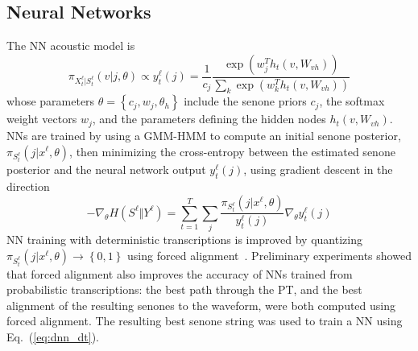 \subsection{Neural Networks}

The NN acoustic model is
\[
\pi_{X_t^{\ell}|S_t^\ell}(v|j,\theta)\propto
y_t^\ell(j)=\frac{1}{c_j}\frac{\exp\left(w_j^Th_t(v,W_{vh})\right)}
{\sum_k \exp\left(w_k^Th_t(v,W_{vh})\right)}
\]
whose parameters $\theta=\left\{c_j,w_j,\theta_h\right\}$ include the
senone priors $c_j$, the softmax weight vectors $w_j$, and the
parameters defining the hidden nodes $h_t(v,W_{vh})$.  NNs are
trained by using a GMM-HMM to compute an initial senone posterior,
$\pi_{S_t^{\ell}}(j|x^\ell,\theta)$, then minimizing the cross-entropy
between the estimated senone posterior and the neural network output
$y_{t}^\ell(j)$,
using gradient descent in the direction
\begin{equation}
  -\nabla_\theta H(S^\ell\Vert Y^\ell)=
  \sum_{t=1}^T\sum_j\frac{\pi_{S_t^{\ell}}(j|x^\ell,\theta)}{y_t^\ell(j)}
  \nabla_\theta y_t^\ell(j)
  \label{eq:dnn_dt}
\end{equation}
NN training with deterministic transcriptions is improved by
quantizing $\pi_{S_t^\ell}(j|x^\ell,\theta)\rightarrow\left\{0,1\right\}$
using forced alignment~\cite{Morgan95}. Preliminary experiments showed
that forced alignment also improves the accuracy of NNs trained from
probabilistic transcriptions: the best path through the PT, and the
best alignment of the resulting senones to the waveform, were both
computed using forced alignment.  The resulting best senone string was
used to train a NN using Eq.~(\ref{eq:dnn_dt}).


